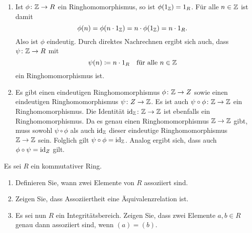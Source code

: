 \begin{solution}
  \begin{enumerate}
    \item
      Ist $\phi \colon \mathbb{Z} \to R$ ein Ringhomomorphismus, so ist $\phi(1_{\mathbb{Z}}) = 1_R$.
      Für alle $n \in \mathbb{Z}$ ist damit
      \[
          \phi(n)
        = \phi(n \cdot 1_{\mathbb{Z}})
        = n \cdot \phi(1_{\mathbb{Z}})
        = n \cdot 1_R.
      \]
      Also ist $\phi$ eindeutig.
      Durch direktes Nachrechnen ergibt sich auch, dass $\psi \colon \mathbb{Z} \to R$ mit
      \[
        \psi(n) \coloneqq n \cdot 1_R
        \quad
        \text{für alle $n \in \mathbb{Z}$}
      \]
      ein Ringhomomorphismus ist.
    \item
      Es gibt einen eindeutigen Ringhomomorphismus $\phi \colon \mathbb{Z} \to Z$ sowie einen eindeutigen Ringhomomorphismus $\psi \colon Z \to \mathbb{Z}$.
      Es ist auch $\psi \circ \phi \colon \mathbb{Z} \to \mathbb{Z}$ ein Ringhomomorphismus.
      Die Identität $\operatorname{id}_{\mathbb{Z}} \colon \mathbb{Z} \to \mathbb{Z}$ ist ebenfalls ein Ringhomomorphismus.
      Da es genau einen Ringhomomorphismus $\mathbb{Z} \to \mathbb{Z}$ gibt, muss sowohl $\psi \circ \phi$ als auch $\operatorname{id}_{\mathbb{Z}}$  dieser eindeutige Ringhomomorphismus $\mathbb{Z} \to \mathbb{Z}$ sein.
      Folglich gilt $\psi \circ \phi = \operatorname{id}_{\mathbb{Z}}$.
      Analog ergibt sich, dass auch $\phi \circ \psi = \operatorname{id}_Z$ gilt.
  \end{enumerate}
\end{solution}


\begin{question}[subtitle = Assoziiertheit in Ringen]
  Es sei $R$ ein kommutativer Ring.
  \begin{enumerate}
    \item
      Definieren Sie, wann zwei Elemente von $R$ assoziiert sind.
    \item
      Zeigen Sie, dass Assoziiertheit eine Äquivalenzrelation ist.
    \item
      Es sei nun $R$ ein Integritätsbereich.
      Zeigen Sie, dass zwei Elemente $a, b \in R$ genau dann assoziiert sind, wenn $(a) = (b)$.
  \end{enumerate}
\end{question}



